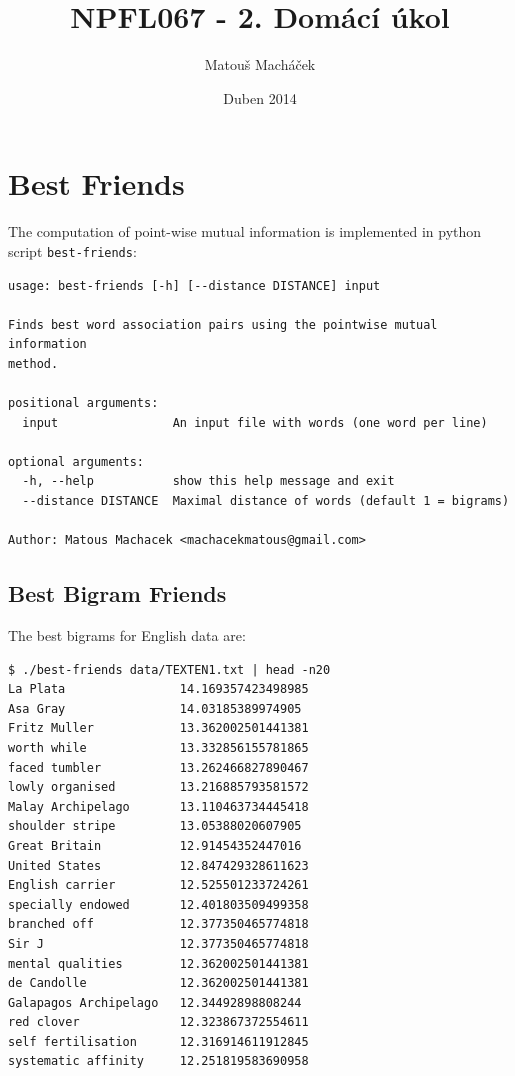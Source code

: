 \documentclass[12pt,a4paper]{article}
\title{NPFL067 - 2. Domácí úkol}
\author{Matouš Macháček}
\date{Duben 2014}
\begin{document}
\maketitle

\section{Best Friends}

The computation of point-wise mutual information is implemented in python
script \texttt{best-friends}:

\begin{verbatim}
usage: best-friends [-h] [--distance DISTANCE] input

Finds best word association pairs using the pointwise mutual information
method.

positional arguments:
  input                An input file with words (one word per line)

optional arguments:
  -h, --help           show this help message and exit
  --distance DISTANCE  Maximal distance of words (default 1 = bigrams)

Author: Matous Machacek <machacekmatous@gmail.com>
\end{verbatim}



\subsection{Best Bigram Friends}

The best bigrams for English data are:

\begin{verbatim}
$ ./best-friends data/TEXTEN1.txt | head -n20
La Plata             	14.169357423498985
Asa Gray             	14.03185389974905
Fritz Muller         	13.362002501441381
worth while          	13.332856155781865
faced tumbler        	13.262466827890467
lowly organised      	13.216885793581572
Malay Archipelago    	13.110463734445418
shoulder stripe      	13.05388020607905
Great Britain        	12.91454352447016
United States        	12.847429328611623
English carrier      	12.525501233724261
specially endowed    	12.401803509499358
branched off         	12.377350465774818
Sir J                	12.377350465774818
mental qualities     	12.362002501441381
de Candolle          	12.362002501441381
Galapagos Archipelago	12.34492898808244
red clover           	12.323867372554611
self fertilisation   	12.316914611912845
systematic affinity  	12.251819583690958
\end{verbatim}
\end{document}
